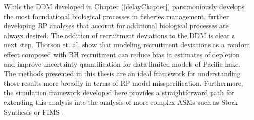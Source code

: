 \documentclass[12pt]{ucscthesis}
\begin{document}
%
While the DDM developed in Chapter (\ref{delayChapter}) parsimoniously develops 
the most foundational biological processes in fisheries management, further 
developing RP analyses that account for additional biological processes are 
always desired. The addition of recruitment deviations to the DDM is clear a next 
step. Thorson et. al. \cite{thorson_case_2019} show that modeling recruitment deviations
as a random effect composed with BH recruitment can reduce bias in estimates of depletion 
and improve uncertainty quantification for data-limited models of Pacific hake. %
The methods presented in this thesis are an ideal framework for understanding those 
results more broadly in terms of RP model misspecification. 
Furthermore, the simulation framework developed here provides a straightforward 
path for extending this analysis into the analysis of more complex ASMs such as Stock 
Synthesis \cite{methot_stock_2013} or FIMS \cite{stawitz_fisheries_2023}.



\end{document}
